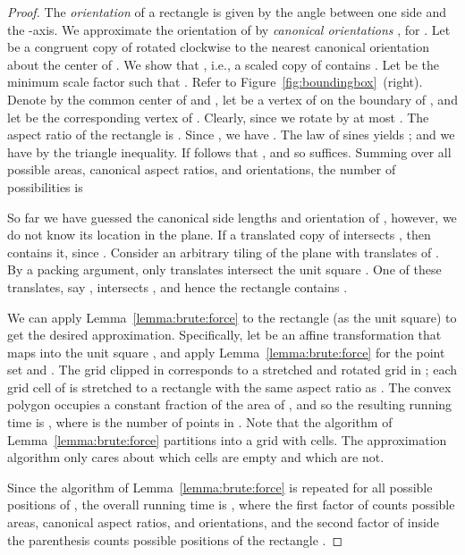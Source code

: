\documentclass[11pt]{article}
\def\ie{{i.e.}}
\newcommand{\lemref}[1]{Lemma~\ref{lemma:#1}}
\newcommand{\figref}[1]{Figure~\ref{fig:#1}}
\begin{document}
\begin{proof}
    The \emph{orientation} of a rectangle is given by the angle between
    one side and the -axis. We approximate the orientation of 
    by \emph{canonical orientations} , for
    . Let  be a congruent copy of 
    rotated clockwise to the nearest canonical orientation about the
    center of . We show that , \ie, a scaled
    copy of  contains . Let  be the minimum scale
    factor such that . Refer to \figref{boundingbox}~(right).
    Denote by  the common center of  and , let  be a vertex
    of  on the boundary of , and let  be the
    corresponding vertex of . Clearly,  since we rotate by at most .
    The aspect ratio of the rectangle  is .
    Since , we have
    .
    The law of sines yields ;
    and we have  by the triangle inequality.
    If follows that , and so  suffices.
    Summing over all possible areas, canonical aspect ratios,
    and orientations, the number of possibilities is
    

    So far we have guessed the canonical side lengths and orientation
    of , however, we do not know its location in the plane. If a
    translated copy  of  intersects , then
     contains it, since .
    Consider an arbitrary tiling of the plane with translates of .
    By a packing argument, only  translates
    intersect the unit square . One of these translates,
    say , intersects , and hence the rectangle  contains .

    We can apply \lemref{brute:force} to the rectangle  (as the
    unit square) to get the desired approximation. Specifically, let
     be an affine transformation
    that maps  into the unit square , and apply \lemref{brute:force}
    for the point set  and . The grid 
    clipped in  corresponds to a stretched and rotated grid
    in ; each grid cell of  is stretched to a rectangle with the
    same aspect ratio as . The convex polygon  occupies a constant
    fraction of the area of , and so the resulting running time is
    , where  is the number of points in .
    Note that the algorithm of \lemref{brute:force} partitions 
    into a grid with  cells. The approximation algorithm only cares
    about which cells are empty and which are not.

    Since the algorithm of \lemref{brute:force} is repeated for all
    possible positions of ,
    the overall running time is
    ,
    where the first factor of  counts possible areas, canonical aspect ratios,
    and orientations, and the second factor of  inside the
    parenthesis counts possible positions of the rectangle .
\end{proof}
\end{document}
